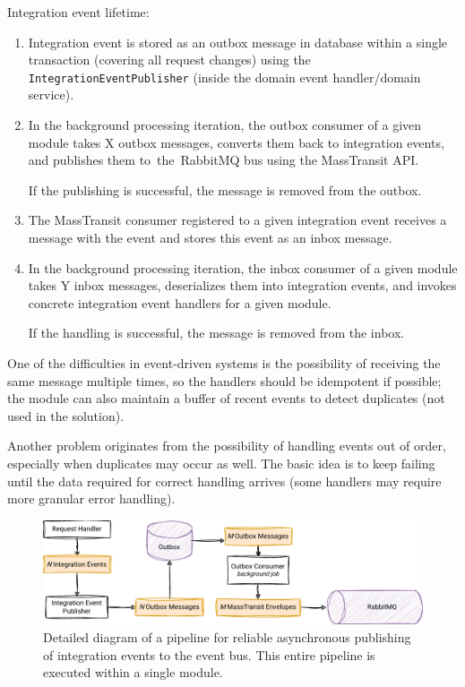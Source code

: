 Integration event lifetime:
\begin{enumerate}
    \item Integration event is stored as an outbox message in database within a single transaction (covering all request changes) using the \texttt{IntegrationEventPublisher} (inside the domain event handler/domain service).

    \item In the background processing iteration, the outbox consumer of a given module takes X outbox messages, converts them back to integration events, and publishes them to~the~RabbitMQ bus using the MassTransit API.

    If the publishing is successful, the message is removed from the outbox.

    \item The MassTransit consumer registered to a given integration event receives a message with the event and stores this event as an inbox message.

    \item In the background processing iteration, the inbox consumer of a given module takes Y inbox messages, deserializes them into integration events, and invokes concrete integration event handlers for a given module.

    If the handling is successful, the message is removed from the inbox. 
\end{enumerate}

One of the difficulties in event-driven systems is the possibility of receiving the same message multiple times, so the handlers should be idempotent if possible; the module can also maintain a buffer of recent events to detect duplicates (not used in the solution).

Another problem originates from the possibility of handling events out of order, especially when duplicates may occur as well. The basic idea is to keep failing until the data required for correct handling arrives (some handlers may require more granular error handling).

\begin{figure} [H]
    \centering
    \includegraphics[width=\textwidth]{figures/mm-produce-pipeline.pdf}
    \caption{Detailed diagram of a pipeline for reliable asynchronous publishing of integration events to the event bus. This entire pipeline is executed within a single module.}
    \label{fig:mm_produce_pipeline}
\end{figure}

